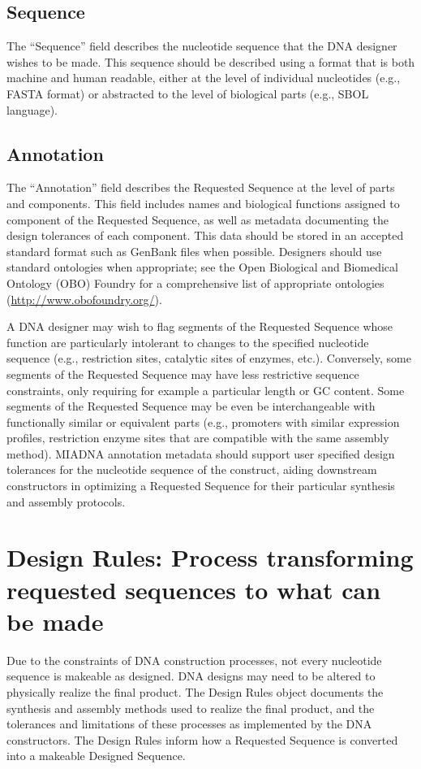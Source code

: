 \documentclass[12pt,letterpaper,english]{article}
\begin{document}
\subsection{Sequence}
The “Sequence” field describes the nucleotide sequence that the DNA designer wishes to be made. This sequence should be described using a format that is both machine and human readable, either at the level of individual nucleotides (e.g., FASTA format) or abstracted to the level of biological parts (e.g., SBOL language). \par

\subsection{Annotation}
The “Annotation” field describes the Requested Sequence at the level of parts and components. This field includes names and biological functions assigned to component of the Requested Sequence, as well as metadata documenting the design tolerances of each component. This data should be stored in an accepted standard format such as GenBank files when possible. Designers should use standard ontologies when appropriate; see the Open Biological and Biomedical Ontology (OBO) Foundry for a comprehensive list of appropriate ontologies (\url{http://www.obofoundry.org/}). \par
A DNA designer may wish to flag segments of the Requested Sequence whose function are particularly intolerant to changes to the specified nucleotide sequence (e.g., restriction sites, catalytic sites of enzymes, etc.). Conversely, some segments of the Requested Sequence may have less restrictive sequence constraints, only requiring for example a particular length or GC content. Some segments of the Requested Sequence may be even be interchangeable with functionally similar or equivalent parts (e.g., promoters with similar expression profiles, restriction enzyme sites that are compatible with the same assembly method). MIADNA annotation metadata should support user specified design tolerances for the nucleotide sequence of the construct, aiding downstream constructors in optimizing a Requested Sequence for their particular synthesis and assembly protocols. \par

\section{Design Rules: Process transforming requested sequences to what can be made}
Due to the constraints of DNA construction processes, not every nucleotide sequence is makeable as designed. DNA designs may need to be altered to physically realize the final product. The Design Rules object documents the synthesis and assembly methods used to realize the final product, and the tolerances and limitations of these processes as implemented by the DNA constructors. The Design Rules inform how a Requested Sequence is converted into a makeable Designed Sequence. \par
\end{document}
